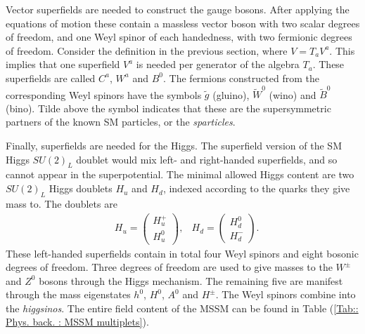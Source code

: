 \documentclass[twoside,english]{uiofysmaster}
\begin{document}
Vector superfields are needed to construct the gauge bosons. After applying the equations of motion these contain a massless vector boson with two scalar degrees of freedom, and one Weyl spinor of each handedness, with two fermionic degrees of freedom. Consider the definition in the previous section, where $V = T_aV^a$. This implies that one superfield $V^a$ is needed per generator of the algebra $T_a$. These superfields are called $C^a$, $W^a$ and $B^0$. The fermions constructed from the corresponding Weyl spinors have the symbols $\tilde{g}$ (gluino), $\tilde{W}^0$ (wino) and $\tilde{B}^0$ (bino). Tilde above the symbol indicates that these are the supersymmetric partners of the known SM particles, or the \textit{sparticles}.

Finally, superfields are needed for the Higgs. The superfield version of the SM Higgs $SU(2)_L$ doublet would mix left- and right-handed superfields, and so cannot appear in the superpotential. The minimal allowed Higgs content are two $SU(2)_L$ Higgs doublets $H_u$ and $H_d$, indexed according to the quarks they give mass to. The doublets are
\begin{align}
&H_u = \begin{pmatrix}
H_u^+\\
H_u^0
\end{pmatrix},
&H_d = \begin{pmatrix}
H_d^0\\
H_d^-
\end{pmatrix}.
\end{align}
These left-handed superfields contain in total four Weyl spinors and eight bosonic degrees of freedom. Three degrees of freedom are used to give masses to the $W^{\pm}$ and $Z^0$ bosons through the Higgs mechanism. The remaining five are manifest through the mass eigenstates $h^0$, $H^0$, $A^0$ and $H^{\pm}$. The Weyl spinors combine into the \textit{higgsinos}. The entire field content of the MSSM can be found in Table (\ref{Tab:: Phys. back. : MSSM multiplets}).
\end{document}
